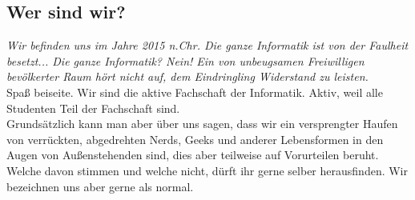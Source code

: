 
	\subsection{Wer sind wir?}
		\glqq\textit{ Wir befinden uns im Jahre 2015 n.Chr. Die ganze Informatik ist von der Faulheit besetzt... Die ganze Informatik? Nein! Ein von unbeugsamen Freiwilligen bevölkerter Raum hört nicht auf, dem Eindringling  Widerstand zu leisten.} \grqq \\
		Spaß beiseite. Wir sind die aktive Fachschaft der Informatik. Aktiv, weil alle Studenten Teil der Fachschaft sind. \\
		Grundsätzlich kann man aber über uns sagen, dass wir ein versprengter Haufen von verrückten, abgedrehten Nerds, Geeks und anderer Lebensformen in den Augen von Außenstehenden sind, dies aber teilweise auf Vorurteilen  
	beruht. Welche davon stimmen und welche nicht, dürft ihr gerne selber herausfinden. Wir bezeichnen uns aber gerne als normal. 	
